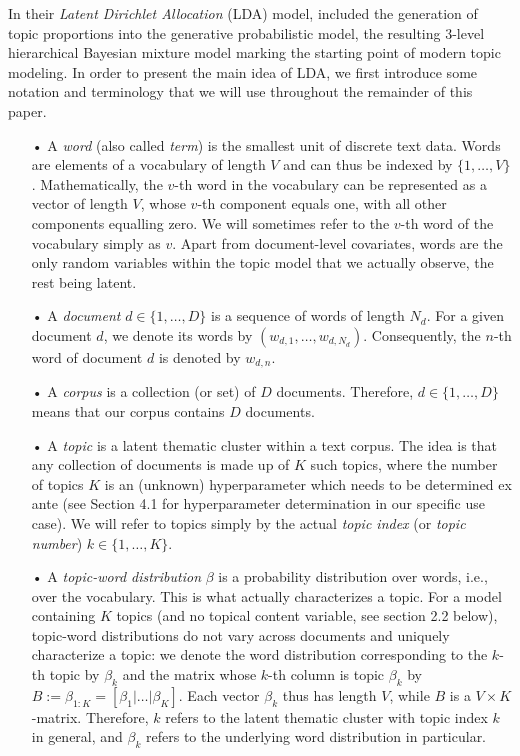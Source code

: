 \documentclass[12pt]{article}
\begin{document}
In their \textit{Latent Dirichlet Allocation} (LDA) model, \cite{blei2003latent} included the generation of topic proportions into the generative probabilistic model, the resulting 3-level hierarchical Bayesian mixture model marking the starting point of modern topic modeling. In order to present the main idea of LDA, we first introduce some notation and terminology that we will use throughout the remainder of this paper.

\begin{itemize}
\vspace{-0.25cm}
\item[•] A \textit{word} (also called \textit{term}) is the smallest unit of discrete text data. Words are elements of a vocabulary of length $V$ and can thus be indexed by $\{1,\dots,V\}$. Mathematically, the $v$-th word in the vocabulary can be represented as a vector of length $V$, whose $v$-th component equals one, with all other components equalling zero. We will sometimes refer to the $v$-th word of the vocabulary simply as $v$. Apart from document-level covariates, words are the only random variables within the topic model that we actually observe, the rest being latent.
\vspace{-0.25cm}
\item[•] A \textit{document} $d \in \{1,\dots,D\}$ is a sequence of words of length $N_{d}$. For a given document $d$, we denote its words by $(w_{d,1},\dots,w_{d,N_{d}})$. Consequently, the $n$-th word of document $d$ is denoted by $w_{d,n}$.
\vspace{-0.25cm}
\item[•] A \textit{corpus} is a collection (or set) of $D$ documents. Therefore, $d \in \{1,\dots,D\}$ means that our corpus contains $D$ documents.
\vspace{-0.25cm}
\item[•] A \textit{topic} is a latent thematic cluster within a text corpus. The idea is that any collection of documents is made up of $K$ such topics, where the number of topics $K$ is an (unknown) hyperparameter which needs to be determined ex ante (see Section 4.1 for hyperparameter determination in our specific use case). We will refer to topics simply by the actual \textit{topic index} (or \textit{topic number}) $k \in \{1,\dots,K\}$.
\vspace{-0.25cm}
\item[•] A \textit{topic-word distribution} $\beta$ is a probability distribution over words, i.e., over the vocabulary. This is what actually characterizes a topic. For a model containing $K$ topics (and no topical content variable, see section 2.2 below), topic-word distributions do not vary across documents and uniquely characterize a topic: we denote the word distribution corresponding to the $k$-th topic by $\beta_k$ and the matrix whose $k$-th column is topic $\beta_k$ by $B:=\beta_{1:K}=[\beta_1|\dots|\beta_K]$. Each vector $\beta_k$ thus has length $V$, while $B$ is a $V \times K$-matrix. Therefore, $k$ refers to the latent thematic cluster with topic index $k$ in general, and $\beta_k$ refers to the underlying word distribution in particular.

\end{itemize}
\end{document}
